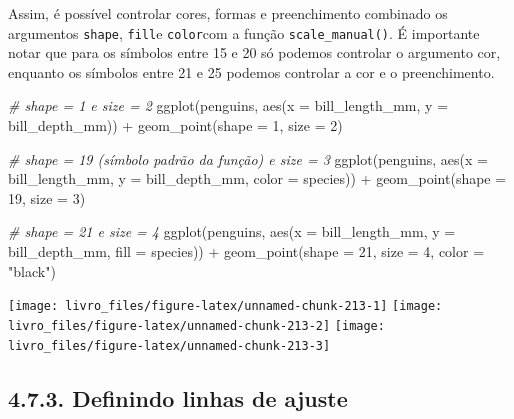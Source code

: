 \documentclass[
]{book}
\newenvironment{Shaded}{\begin{snugshade}}{\end{snugshade}}
\newcommand{\AttributeTok}[1]{\textcolor[rgb]{0.61,0.61,0.61}{#1}}
\newcommand{\CommentTok}[1]{\textcolor[rgb]{0.37,0.37,0.37}{\textit{#1}}}
\newcommand{\DecValTok}[1]{\textcolor[rgb]{0.06,0.06,0.06}{#1}}
\newcommand{\FunctionTok}[1]{\textcolor[rgb]{0,0,0}{#1}}
\newcommand{\NormalTok}[1]{#1}
\newcommand{\SpecialCharTok}[1]{\textcolor[rgb]{0,0,0}{#1}}
\newcommand{\StringTok}[1]{\textcolor[rgb]{0.5,0.5,0.5}{#1}}
\begin{document}
Assim, é possível controlar cores, formas e preenchimento combinado os argumentos \texttt{shape}, \texttt{fill}e \texttt{color}com a função \texttt{scale\_manual()}. É importante notar que para os símbolos entre 15 e 20 só podemos controlar o argumento cor, enquanto os símbolos entre 21 e 25 podemos controlar a cor e o preenchimento.

\begin{Shaded}
\begin{Highlighting}[]

\CommentTok{\# shape = 1 e size = 2}
\FunctionTok{ggplot}\NormalTok{(penguins, }\FunctionTok{aes}\NormalTok{(}\AttributeTok{x =}\NormalTok{ bill\_length\_mm, }\AttributeTok{y =}\NormalTok{ bill\_depth\_mm)) }\SpecialCharTok{+}
  \FunctionTok{geom\_point}\NormalTok{(}\AttributeTok{shape =} \DecValTok{1}\NormalTok{, }\AttributeTok{size =} \DecValTok{2}\NormalTok{)}

\CommentTok{\# shape = 19 (símbolo padrão da função) e size = 3}
\FunctionTok{ggplot}\NormalTok{(penguins, }
       \FunctionTok{aes}\NormalTok{(}\AttributeTok{x =}\NormalTok{ bill\_length\_mm, }\AttributeTok{y =}\NormalTok{ bill\_depth\_mm, }\AttributeTok{color =}\NormalTok{ species)) }\SpecialCharTok{+}
  \FunctionTok{geom\_point}\NormalTok{(}\AttributeTok{shape =} \DecValTok{19}\NormalTok{, }\AttributeTok{size =} \DecValTok{3}\NormalTok{)}

\CommentTok{\# shape = 21 e size = 4}
\FunctionTok{ggplot}\NormalTok{(penguins, }
       \FunctionTok{aes}\NormalTok{(}\AttributeTok{x =}\NormalTok{ bill\_length\_mm, }\AttributeTok{y =}\NormalTok{ bill\_depth\_mm, }\AttributeTok{fill =}\NormalTok{ species)) }\SpecialCharTok{+}
  \FunctionTok{geom\_point}\NormalTok{(}\AttributeTok{shape =} \DecValTok{21}\NormalTok{, }\AttributeTok{size =} \DecValTok{4}\NormalTok{, }\AttributeTok{color =} \StringTok{"black"}\NormalTok{)}
\end{Highlighting}
\end{Shaded}

\begin{center}\texttt{[image: livro\_files/figure-latex/unnamed-chunk-213-1]} \texttt{[image: livro\_files/figure-latex/unnamed-chunk-213-2]} \texttt{[image: livro\_files/figure-latex/unnamed-chunk-213-3]} \end{center}

\hypertarget{definindo-linhas-de-ajuste}{%
\subsection{4.7.3. Definindo linhas de ajuste}\label{definindo-linhas-de-ajuste}}
\end{document}

